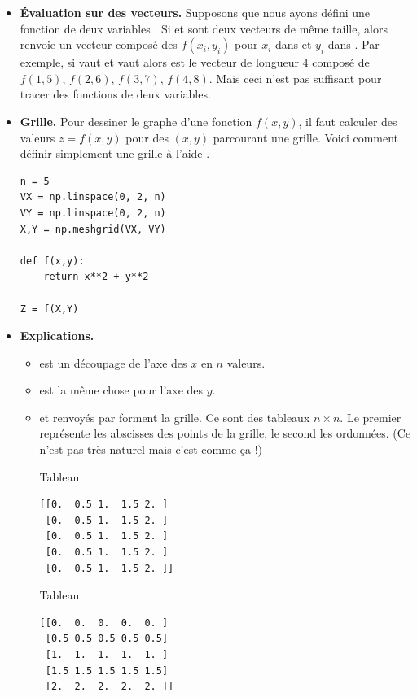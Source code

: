 \documentclass[11pt,class=report,crop=false]{standalone}
\begin{document}
\begin{itemize}
  \item \textbf{\'Evaluation sur des vecteurs.} 
Supposons que nous ayons défini une fonction \Python{} de deux variables .
Si  et  sont deux vecteurs de même taille, alors
 renvoie un vecteur composé des $f(x_i,y_i)$ pour $x_i$ dans  et $y_i$ dans .
Par exemple, si  vaut \ci{[1 2 3 4]} et  vaut \ci{[5 6 7 8]}
alors  est le vecteur de longueur $4$ composé de $f(1,5)$,
$f(2,6)$, $f(3,7)$, $f(4,8)$. Mais ceci n'est pas suffisant pour tracer des fonctions de deux variables. 
  \item \textbf{Grille.} 
Pour dessiner le graphe d'une fonction $f(x,y)$, il faut calculer des valeurs $z=f(x,y)$ pour des $(x,y)$ parcourant une grille. Voici comment définir simplement une grille à l'aide .

\begin{lstlisting}
n = 5
VX = np.linspace(0, 2, n)
VY = np.linspace(0, 2, n)
X,Y = np.meshgrid(VX, VY)

def f(x,y):
	return x**2 + y**2

Z = f(X,Y)
\end{lstlisting}

  \item \textbf{Explications.}
  \begin{itemize}
    \item {} est un découpage de l'axe des $x$ en $n$ valeurs.
    \item {} est la même chose pour l'axe des $y$.    
    \item {} et  renvoyés par  forment la grille. Ce sont des tableaux $n\times n$. Le premier représente les abscisses des points de la grille, le second les ordonnées. (Ce n'est pas très naturel mais c'est comme ça !)
     
    
\bigskip

\begin{center}
\begin{minipage}{0.45\textwidth}
Tableau 
\begin{center}
\begin{lstlisting}
[[0.  0.5 1.  1.5 2. ]
 [0.  0.5 1.  1.5 2. ]
 [0.  0.5 1.  1.5 2. ]
 [0.  0.5 1.  1.5 2. ]
 [0.  0.5 1.  1.5 2. ]]
\end{lstlisting}
\end{center}
\end{minipage}
\begin{minipage}{0.45\textwidth}
Tableau 
\begin{center}
\begin{lstlisting}
[[0.  0.  0.  0.  0. ]
 [0.5 0.5 0.5 0.5 0.5]
 [1.  1.  1.  1.  1. ]
 [1.5 1.5 1.5 1.5 1.5]
 [2.  2.  2.  2.  2. ]]   
\end{lstlisting}
\end{center}
\end{minipage} 
\end{center}


\end{itemize}
\end{itemize}
\end{document}
